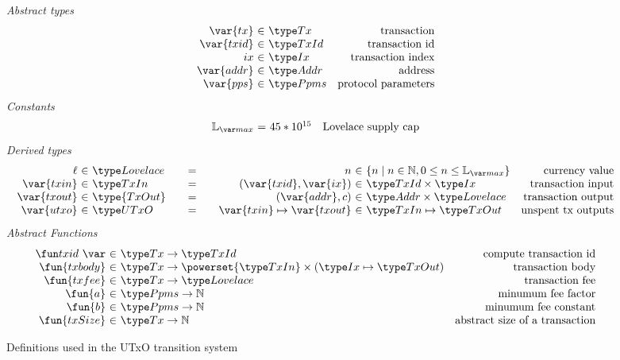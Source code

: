\begin{figure*}[htb]
  \emph{Abstract types}
  \begin{equation*}
    \begin{array}{r@{~\in~}lr}
      \var{tx} & \Tx & \text{transaction}\\
      \var{txid} & \TxId & \text{transaction id}\\
      ix & \Ix & \text{transaction index}\\
      \var{addr} & \Addr & \text{address}\\
      \var{pps} & \PPMMap & \text{protocol parameters}
    \end{array}
  \end{equation*}
  \emph{Constants}
  \begin{equation*}
    \begin{array}{r@{~=~}lr}
      \Lmax & 45*10^{15} & \text{Lovelace supply cap}\\
    \end{array}
  \end{equation*}
  \emph{Derived types}
  \begin{equation*}
    \begin{array}{r@{~\in~}l@{\qquad=\qquad}r@{~\in~}lr}
      \ell & \Lovelace
      & n  & \{ n \mid n \in  \mathbb{N}, 0 \leq n \leq \Lmax \}
      & \text{currency value}
      \\
      \var{txin}
      & \TxIn
      & (\var{txid}, \var{ix})
      & \TxId \times \Ix
      & \text{transaction input}
      \\
      \var{txout}
      & \type{TxOut}
      & (\var{addr}, c)
      & \Addr \times \Lovelace
      & \text{transaction output}
      \\
      \var{utxo}
      & \UTxO
      & \var{txin} \mapsto \var{txout}
      & \TxIn \mapsto \TxOut
      & \text{unspent tx outputs}
    \end{array}
  \end{equation*}
  \emph{Abstract Functions}
  \begin{equation*}
    \begin{array}{r@{~\in~}lr}
      \txid{} & \Tx \to \TxId & \text{compute transaction id}\\
      \fun{txbody} & \Tx \to \powerset{\TxIn} \times (\Ix \mapsto \TxOut)
                                  & \text{transaction body}\\
      \fun{txfee} & \Tx \to \Lovelace & \text{transaction fee}\\
      \fun{a} & \PPMMap \to \mathbb{N} & \text{minumum fee factor}\\
      \fun{b} & \PPMMap \to \mathbb{N} & \text{minumum fee constant}\\
      \fun{txSize} & \Tx \to \mathbb{N} & \text{abstract size of a transaction}
    \end{array}
  \end{equation*}
  \caption{Definitions used in the UTxO transition system}
  \label{fig:defs:utxo}
\end{figure*}

